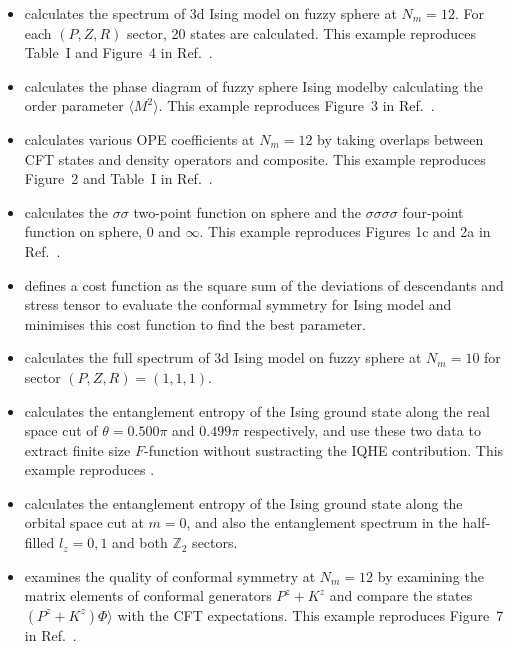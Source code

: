 \documentclass{timesjhep}
\begin{document}
\begin{itemize}
    \item {} calculates the spectrum of 3d Ising model on fuzzy sphere at $N_m = 12$. For each $(P,Z,R)$ sector, 20 states are calculated. This example reproduces Table~I and Figure~4 in Ref.~\cite{Zhu2022}.
    \item {} calculates the phase diagram of fuzzy sphere Ising modelby calculating the order parameter $\langle M^2\rangle$. This example reproduces Figure~3 in Ref.~\cite{Zhu2022}.
    \item {} calculates various OPE coefficients at $N_m = 12$ by taking overlaps between CFT states and density operators and composite. This example reproduces Figure~2 and Table~I in Ref.~\cite{Hu2023Mar}.
    \item {} calculates the $\sigma\sigma$ two-point function on sphere and the $\sigma\sigma\sigma\sigma$ four-point function on sphere, 0 and $\infty$. This example reproduces Figures 1c and 2a in Ref.~\cite{Han2023Jun}.
    \item {} defines a cost function as the square sum of the deviations of descendants and stress tensor to evaluate the conformal symmetry for Ising model and minimises this cost function to find the best parameter.
    \item {} calculates the full spectrum of 3d Ising model on fuzzy sphere at $N_m = 10$ for sector $(P,Z,R) = (1,1,1)$.
    \item {} calculates the entanglement entropy of the Ising ground state along the real space cut of $\theta = 0.500π$ and $0.499π$ respectively, and use these two data to extract finite size $F$-function without sustracting the IQHE contribution. This example reproduces \cite{Hu2024}.
    \item {} calculates the entanglement entropy of the Ising ground state along the orbital space cut at $m = 0$, and also the entanglement spectrum in the half-filled $l_z = 0, 1$ and  both $\mathbb{Z}_2$ sectors.
    \item {} examines the quality of conformal symmetry at $N_m = 12$ by examining the matrix elements of conformal generators $P^z + K^z$ and compare the states $(P^z + K^z)\Phi⟩$ with the CFT expectations. This example reproduces Figure~7 in Ref.~\cite{Fardelli2024}.

\end{itemize}
\end{document}
